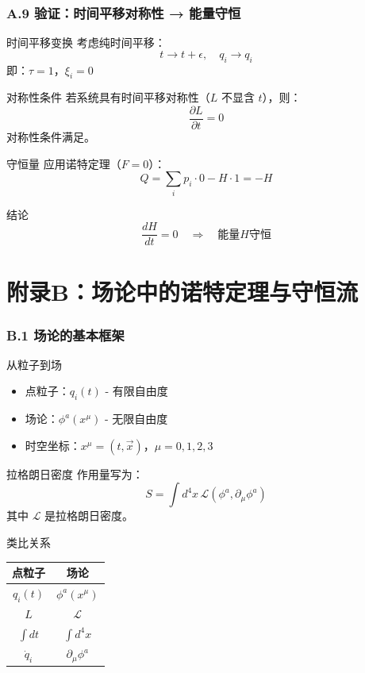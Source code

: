 \documentclass[xcolor=dvipsnames]{ctexbeamer}
\begin{document}
\begin{frame}
\frametitle{A.9 验证：时间平移对称性 → 能量守恒}
\begin{block}{时间平移变换}
考虑纯时间平移：
$$t \to t + \epsilon, \quad q_i \to q_i$$
即：$\tau = 1$，$\xi_i = 0$
\end{block}

\pause

\begin{block}{对称性条件}
若系统具有时间平移对称性（$L$ 不显含 $t$），则：
$$\frac{\partial L}{\partial t} = 0$$
对称性条件满足。
\end{block}

\pause

\begin{block}{守恒量}
应用诺特定理（$F=0$）：
$$Q = \sum_i p_i \cdot 0 - H \cdot 1 = -H$$
\end{block}

\pause

\begin{alertblock}{结论}
$$\boxed{\frac{dH}{dt} = 0 \quad \Rightarrow \quad \text{能量} H \text{守恒}}$$
\end{alertblock}
\end{frame}

\section{附录B：场论中的诺特定理与守恒流}

\begin{frame}
\frametitle{B.1 场论的基本框架}
\begin{block}{从粒子到场}
\begin{itemize}
\item 点粒子：$q_i(t)$ - 有限自由度
\item 场论：$\phi^a(x^\mu)$ - 无限自由度
\item 时空坐标：$x^\mu = (t, \vec{x})$，$\mu = 0,1,2,3$
\end{itemize}
\end{block}

\pause

\begin{block}{拉格朗日密度}
作用量写为：
$$S = \int d^4x \, \mathcal{L}(\phi^a, \partial_\mu\phi^a)$$
其中 $\mathcal{L}$ 是拉格朗日密度。
\end{block}

\pause

\begin{block}{类比关系}
\begin{center}
\begin{tabular}{c|c}
点粒子 & 场论 \\
\hline
$q_i(t)$ & $\phi^a(x^\mu)$ \\
$L$ & $\mathcal{L}$ \\
$\int dt$ & $\int d^4x$ \\
$\dot{q}_i$ & $\partial_\mu\phi^a$
\end{tabular}
\end{center}
\end{block}
\end{frame}
\end{document}
